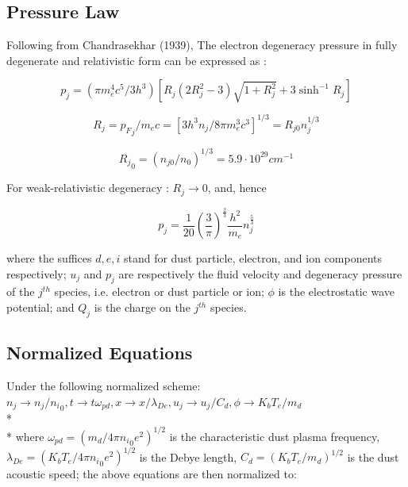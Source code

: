 \documentclass[journal]{IEEEtran}
\begin{document}
\subsection{Pressure Law}
	Following from Chandrasekhar (1939), The electron degeneracy pressure in fully degenerate and relativistic form can be expressed as : 

		\begin{equation}
				p_j = (\pi m_e^4c^5/3h^3)[R_j(2R_j^2 - 3)\sqrt{1 + R_j^2} + 3 \sinh^{-1}R_j] 
		\end{equation}
		
		\begin{equation}
			R_j = {p_F}_j/m_ec = [3h^3n_j/8\pi m_e^3c^3]^{1/3}= R_{j0}n_j^{1/3}
		\end{equation}
		
		\begin{equation*} 
			{R_j}_0 = (n_{j0}/n_0)^{1/3} = 5.9 \cdot 10^{29} cm^{-1}
		\end{equation*}
		
		For weak-relativistic degeneracy : $R_j\rightarrow 0$, and, hence
		
		\begin{equation*}
			p_j = \frac{1}{20}(\frac{3}{\pi})^{\frac{2}{3}}\frac{h^2}{m_e}n_j^{\frac{5}{3}}
		\end{equation*}

		where the suffices $d, e, i$ stand for dust particle, electron, and ion components respectively; $u_j$ and $p_j$ are respectively the fluid velocity and degeneracy pressure of the $j^{th}$ species, i.e. electron or dust particle or ion; $\phi$ is the electrostatic wave potential; and $Q_j$ is the charge on the $j^{th}$ species.

	\subsection{Normalized Equations}

			Under the following normalized scheme:
			$n_j \rightarrow n_j/{n_i}_0, t \rightarrow t\omega_{pd}, x \rightarrow x/\lambda_{De}, u_j \rightarrow u_j/C_d, \phi \rightarrow K_bT_e/m_d$ \\*\\*
			where $\omega_{pd} = (m_d/4\pi {n_i}_0 e^2)^{1/2}$ is the characteristic dust plasma frequency, $\lambda_{De} = (K_bT_e/4\pi {n_i}_0 e^2)^{1/2}$ is the Debye length, $C_d = (K_bT_e/m_d)^{1/2}$ is the dust acoustic speed; the above equations are then normalized to:
	
\end{document}
